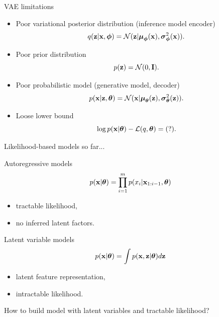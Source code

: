 \begin{frame}{VAE limitations}
	\begin{itemize}
		\item Poor variational posterior distribution (inference model encoder)
		\[
		q(\mathbf{z} | \mathbf{x}, \boldsymbol{\phi}) = \mathcal{N}(\mathbf{z}| \boldsymbol{\mu}_{\boldsymbol{\phi}}(\mathbf{x}), \boldsymbol{\sigma}^2_{\boldsymbol{\phi}}(\mathbf{x})).
		\]
		\item Poor prior distribution
		\[
		p(\mathbf{z}) = \mathcal{N}(0, \mathbf{I}).
		\]
		\item Poor probabilistic model (generative model, decoder)
		\[
		p(\mathbf{x} | \mathbf{z}, \boldsymbol{\theta}) = \mathcal{N}(\mathbf{x}| \boldsymbol{\mu}_{\boldsymbol{\theta}}(\mathbf{z}), \boldsymbol{\sigma}^2_{\boldsymbol{\theta}}(\mathbf{z})).
		\]
		\item Loose lower bound
		\[
		\log p(\mathbf{x} | \boldsymbol{\theta}) - \mathcal{L}(q, \boldsymbol{\theta}) = (?).
		\]
	\end{itemize}
\end{frame}
\begin{frame}{Likelihood-based models so far...}
	\begin{minipage}[t]{0.5\columnwidth}
		\begin{block}{Autoregressive models}
			\vspace{-0.5cm}
			\[
			p(\mathbf{x}|\boldsymbol{\theta}) = \prod_{i=1}^m p(x_i | \mathbf{x}_{1:i - 1}, \boldsymbol{\theta})
			\]
			\vspace{-0.2cm}
			\begin{itemize}
				\item tractable likelihood, 
				\item no inferred latent factors.
			\end{itemize}
		\end{block}
	\end{minipage}%
	\begin{minipage}[t]{0.5\columnwidth}
		\begin{block}{Latent variable models}
			\[
			p(\mathbf{x}| \boldsymbol{\theta}) = \int p(\mathbf{x}, \mathbf{z} | \boldsymbol{\theta}) d \mathbf{z}
			\]
			\begin{itemize}
				\item latent feature representation, 
				\item intractable likelihood.
			\end{itemize}
		\end{block}
	\end{minipage}
	
	\vspace{1cm } 
	How to build model with latent variables and tractable likelihood?
\end{frame}
